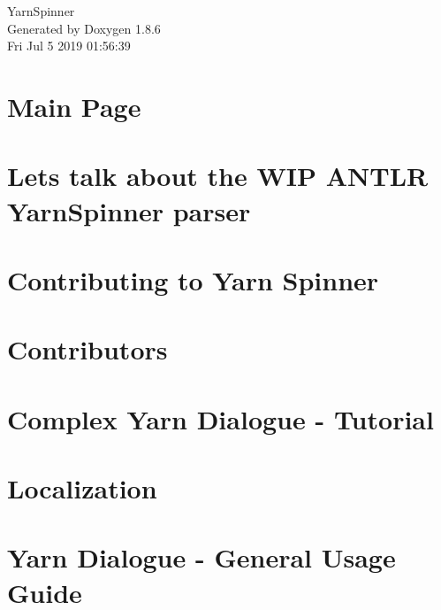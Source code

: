 \documentclass[twoside]{book}
\newcommand{\clearemptydoublepage}{%
  \newpage{\pagestyle{empty}\cleardoublepage}%
}
\begin{document}
\hypersetup{pageanchor=false}
\begin{titlepage}
\vspace*{7cm}
\begin{center}%
{\Large Yarn\-Spinner }\\
\vspace*{1cm}
{\large Generated by Doxygen 1.8.6}\\
\vspace*{0.5cm}
{\small Fri Jul 5 2019 01:56:39}\\
\end{center}
\end{titlepage}
\clearemptydoublepage
\tableofcontents
\clearemptydoublepage
{}
\hypersetup{pageanchor=true}

\chapter{Main Page}
\label{index}\hypertarget{index}{}
\chapter{Lets talk about the W\-I\-P A\-N\-T\-L\-R Yarn\-Spinner parser}
\label{a00002}
\hypertarget{a00002}{}

\chapter{Contributing to Yarn Spinner}
\label{a00004}
\hypertarget{a00004}{}

\chapter{Contributors}
\label{a00006}
\hypertarget{a00006}{}

\chapter{Complex Yarn Dialogue -\/ Tutorial}
\label{a00008}
\hypertarget{a00008}{}

\chapter{Localization}
\label{a00010}
\hypertarget{a00010}{}

\chapter{Yarn Dialogue -\/ General Usage Guide}
\label{a00012}
\hypertarget{a00012}{}

\end{document}
